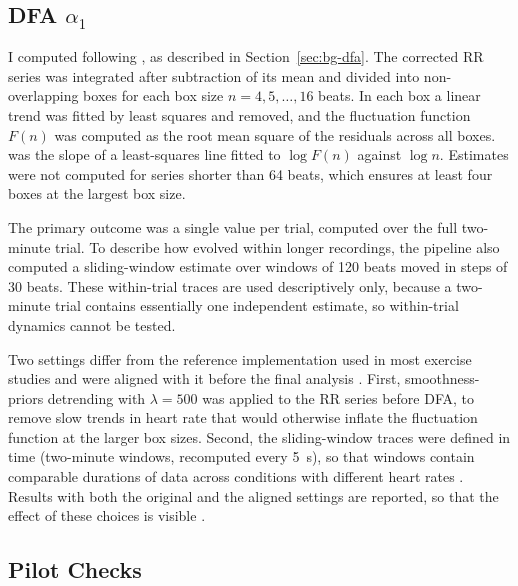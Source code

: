 \subsection{DFA $\alpha_1$}
\label{sec:dfa-implementation}

I computed \al{} following \citet{peng1995}, as described in Section~\ref{sec:bg-dfa}. The corrected RR series was integrated after subtraction of its mean and divided into non-overlapping boxes for each box size $n = 4, 5, \dots, 16$ beats. In each box a linear trend was fitted by least squares and removed, and the fluctuation function $F(n)$ was computed as the root mean square of the residuals across all boxes. \al{} was the slope of a least-squares line fitted to $\log F(n)$ against $\log n$. Estimates were not computed for series shorter than 64 beats, which ensures at least four boxes at the largest box size.

The primary outcome was a single \al{} value per trial, computed over the full two-minute trial. To describe how \al{} evolved within longer recordings, the pipeline also computed a sliding-window estimate over windows of 120 beats moved in steps of 30 beats. These within-trial traces are used descriptively only, because a two-minute trial contains essentially one independent estimate, so within-trial dynamics cannot be tested.

Two settings differ from the reference implementation used in most exercise studies and were aligned with it before the final analysis . First, smoothness-priors detrending with $\lambda = 500$ \citep{tarvainen2002} was applied to the RR series before DFA, to remove slow trends in heart rate that would otherwise inflate the fluctuation function at the larger box sizes. Second, the sliding-window traces were defined in time (two-minute windows, recomputed every 5~s), so that windows contain comparable durations of data across conditions with different heart rates \citep{rogers2022update}. Results with both the original and the aligned settings are reported, so that the effect of these choices is visible \citep{hoos2025}.

\subsection{Pilot Checks}
\label{sec:pilot-checks}

